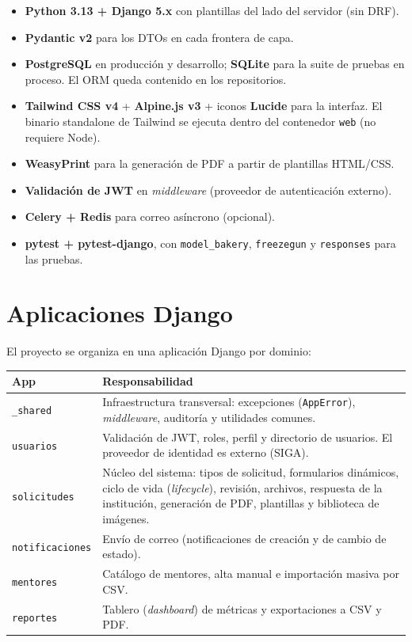 \documentclass[12pt,letterpaper]{report}
\begin{document}
\begin{itemize}[leftmargin=1.4em]
  \item \textbf{Python 3.13 + Django 5.x} con plantillas del lado del servidor
        (sin DRF).
  \item \textbf{Pydantic v2} para los DTOs en cada frontera de capa.
  \item \textbf{PostgreSQL} en producción y desarrollo; \textbf{SQLite} para la
        suite de pruebas en proceso. El ORM queda contenido en los repositorios.
  \item \textbf{Tailwind CSS v4} + \textbf{Alpine.js v3} + iconos \textbf{Lucide}
        para la interfaz. El binario standalone de Tailwind se ejecuta dentro del
        contenedor \texttt{web} (no requiere Node).
  \item \textbf{WeasyPrint} para la generación de PDF a partir de plantillas
        HTML/CSS.
  \item \textbf{Validación de JWT} en \emph{middleware} (proveedor de autenticación
        externo).
  \item \textbf{Celery + Redis} para correo asíncrono (opcional).
  \item \textbf{pytest + pytest-django}, con \texttt{model\_bakery},
        \texttt{freezegun} y \texttt{responses} para las pruebas.
\end{itemize}

\section{Aplicaciones Django}

El proyecto se organiza en una aplicación Django por dominio:

\begin{longtable}{L{3.2cm} L{11cm}}
\toprule
\textbf{App} & \textbf{Responsabilidad} \\
\midrule
\endhead
\texttt{\_shared} & Infraestructura transversal: excepciones (\texttt{AppError}),
  \emph{middleware}, auditoría y utilidades comunes. \\
\texttt{usuarios} & Validación de JWT, roles, perfil y directorio de usuarios.
  El proveedor de identidad es externo (SIGA). \\
\texttt{solicitudes} & Núcleo del sistema: tipos de solicitud, formularios
  dinámicos, ciclo de vida (\emph{lifecycle}), revisión, archivos, respuesta de
  la institución, generación de PDF, plantillas y biblioteca de imágenes. \\
\texttt{notificaciones} & Envío de correo (notificaciones de creación y de
  cambio de estado). \\
\texttt{mentores} & Catálogo de mentores, alta manual e importación masiva por
  CSV. \\
\texttt{reportes} & Tablero (\emph{dashboard}) de métricas y exportaciones a CSV
  y PDF. \\
\bottomrule
\end{longtable}
\end{document}
